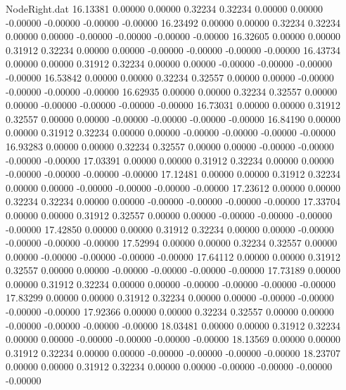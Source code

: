 \begin{filecontents}{NodeRight.dat}
  16.13381    0.00000    0.00000     0.32234    0.32234    0.00000    0.00000   -0.00000   -0.00000   -0.00000   -0.00000
  16.23492    0.00000    0.00000     0.32234    0.32234    0.00000    0.00000   -0.00000   -0.00000   -0.00000   -0.00000
  16.32605    0.00000    0.00000     0.31912    0.32234    0.00000    0.00000   -0.00000   -0.00000   -0.00000   -0.00000
  16.43734    0.00000    0.00000     0.31912    0.32234    0.00000    0.00000   -0.00000   -0.00000   -0.00000   -0.00000
  16.53842    0.00000    0.00000     0.32234    0.32557    0.00000    0.00000   -0.00000   -0.00000   -0.00000   -0.00000
  16.62935    0.00000    0.00000     0.32234    0.32557    0.00000    0.00000   -0.00000   -0.00000   -0.00000   -0.00000
  16.73031    0.00000    0.00000     0.31912    0.32557    0.00000    0.00000   -0.00000   -0.00000   -0.00000   -0.00000
  16.84190    0.00000    0.00000     0.31912    0.32234    0.00000    0.00000   -0.00000   -0.00000   -0.00000   -0.00000
  16.93283    0.00000    0.00000     0.32234    0.32557    0.00000    0.00000   -0.00000   -0.00000   -0.00000   -0.00000
  17.03391    0.00000    0.00000     0.31912    0.32234    0.00000    0.00000   -0.00000   -0.00000   -0.00000   -0.00000
  17.12481    0.00000    0.00000     0.31912    0.32234    0.00000    0.00000   -0.00000   -0.00000   -0.00000   -0.00000
  17.23612    0.00000    0.00000     0.32234    0.32234    0.00000    0.00000   -0.00000   -0.00000   -0.00000   -0.00000
  17.33704    0.00000    0.00000     0.31912    0.32557    0.00000    0.00000   -0.00000   -0.00000   -0.00000   -0.00000
  17.42850    0.00000    0.00000     0.31912    0.32234    0.00000    0.00000   -0.00000   -0.00000   -0.00000   -0.00000
  17.52994    0.00000    0.00000     0.32234    0.32557    0.00000    0.00000   -0.00000   -0.00000   -0.00000   -0.00000
  17.64112    0.00000    0.00000     0.31912    0.32557    0.00000    0.00000   -0.00000   -0.00000   -0.00000   -0.00000
  17.73189    0.00000    0.00000     0.31912    0.32234    0.00000    0.00000   -0.00000   -0.00000   -0.00000   -0.00000
  17.83299    0.00000    0.00000     0.31912    0.32234    0.00000    0.00000   -0.00000   -0.00000   -0.00000   -0.00000
  17.92366    0.00000    0.00000     0.32234    0.32557    0.00000    0.00000   -0.00000   -0.00000   -0.00000   -0.00000
  18.03481    0.00000    0.00000     0.31912    0.32234    0.00000    0.00000   -0.00000   -0.00000   -0.00000   -0.00000
  18.13569    0.00000    0.00000     0.31912    0.32234    0.00000    0.00000   -0.00000   -0.00000   -0.00000   -0.00000
  18.23707    0.00000    0.00000     0.31912    0.32234    0.00000    0.00000   -0.00000   -0.00000   -0.00000   -0.00000

\end{filecontents}

